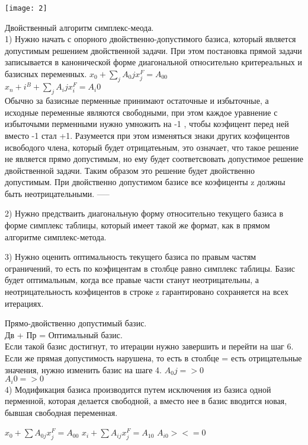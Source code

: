 \texttt{[image: 2]}



\Large {Двойственный алгоритм симплекс-меода.}\\

1) Нужно начать с опорного двойственно-допустимого базиса, который является допустимым решением двойственной задачи.
При этом постановка прямой задачи записывается  в канонической форме диагональной относительно критереальных и базисных переменных.
$ x_0 + \sum \limits_j A_0j x_j^F = A_00 $\\
$x_n+i ^B +  \sum \limits_j A_ij x_i^F = A_i0 $\\

Обычно за базисные перменные принимают остаточные и избыточные, а исходные переменные являются свободными,
при этом каждое уравнение с избыточыми перменными нужно умножить на -1 , чтобы коэфицент перед ней вместо -1 стал +1.
Разумеется при этом изменяться знаки других коэфицентов исвободого члена, который будет отрицатеьным, это означает, что такое решение не является прямо допустимым, но ему будет соответсвовать допустимое решение двойственной задачи.
Таким образом это решение будет двойственно допустимым.
При двойственно допустимом базисе  все коэфиценты z должны быть неотрицательными. -----

2) Нужно  предстваить диагональную форму относительно текущего базиса в форме симплекс таблицы,
который имеет такой же формат, как в прямом алгоритме симплекс-метода.


3) Нужно оценить оптимальность текущего базиса по правым частям ограничений,
то есть по коэфицентам в столбце равно симплекс таблицы. Базис будет оптимальным,
когда все правые части станут неотрицательны, а неотрицательность коэфицентов в строке z гарантировано сохраняется на всех итерациях.


Прямо-двойственно допустимый базис.\\
Дв + Пр = Оптимальный базис.\\
Если такой базис достигнут, то итерации нужно завершить и перейти на шаг 6.
Если же прямая допустимость нарушена, то есть в столбце = есть отрицательные значения, нужно изменить базис на шаге 4.
$ A_0j => 0 $\\
$ A_i0 => 0 $\\

4) Модификация базиса производится путем исключения из базиса одной перменной, которая делается свободной,
а вместо нее в базис вводится новая, бывшая свободная переменная.


$ x_0 + \sum A_{0j} x_j^F = A_{00}$
$ x_i + \sum A_{ij} x_j^F = A_{10}$
$A_{i0} ><= 0$
